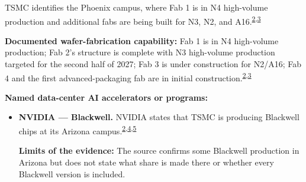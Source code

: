 \begin{minipage}[t][0.90\textheight][t]{\textwidth}
\begin{minipage}[t]{\textwidth}
\begin{minipage}[t]{0.32\textwidth}
\medskip
{\footnotesize TSMC identifies the Phoenix campus, where Fab 1 is in N4 high-volume production and additional fabs are being built for N3, N2, and A16.\nobreak\textsuperscript{\href{\detokenize{https://www.tsmc.com/static/abouttsmcaz/index.htm}}{\textcolor{accent}{2}},\href{\detokenize{https://investor.tsmc.com/chinese/encrypt/files/encrypt_file/reports/2026-04/3cef85204275f94fd111485cfdf4adb3c0263c45/TSMC}\%\detokenize{201Q26}\%\detokenize{20Transcript.pdf}}{\textcolor{accent}{3}}}\par}
\medskip
{\footnotesize\textbf{Documented wafer-fabrication capability:} Fab 1 is in N4 high-volume production; Fab 2's structure is complete with N3 high-volume production targeted for the second half of 2027; Fab 3 is under construction for N2/A16; Fab 4 and the first advanced-packaging fab are in initial construction.\nobreak\textsuperscript{\href{\detokenize{https://www.tsmc.com/static/abouttsmcaz/index.htm}}{\textcolor{accent}{2}},\href{\detokenize{https://investor.tsmc.com/chinese/encrypt/files/encrypt_file/reports/2026-04/3cef85204275f94fd111485cfdf4adb3c0263c45/TSMC}\%\detokenize{201Q26}\%\detokenize{20Transcript.pdf}}{\textcolor{accent}{3}}}\par}
\end{minipage}
\end{minipage}
\par\vspace{0.65em}
\medskip
{\footnotesize\textbf{Named data-center AI accelerators or programs:}\par}
\begin{itemize}[leftmargin=1.25em,itemsep=0.35em,topsep=0.15em,parsep=0pt]
\item {\footnotesize\textbf{NVIDIA --- Blackwell.} NVIDIA states that TSMC is producing Blackwell chips at its Arizona campus.\nobreak\textsuperscript{\href{\detokenize{https://www.tsmc.com/static/abouttsmcaz/index.htm}}{\textcolor{accent}{2}},\href{\detokenize{https://blogs.nvidia.com/blog/tsmc-blackwell-manufacturing/}}{\textcolor{accent}{4}},\href{\detokenize{https://developer.nvidia.com/blog/nvidia-blackwell-platform-sets-new-llm-inference-records-in-mlperf-inference-v4-1/}}{\textcolor{accent}{5}}}\par {\scriptsize\color{black!62}\textbf{Limits of the evidence:} The source confirms some Blackwell production in Arizona but does not state what share is made there or whether every Blackwell version is included.\par}}

\end{itemize}
\end{minipage}
